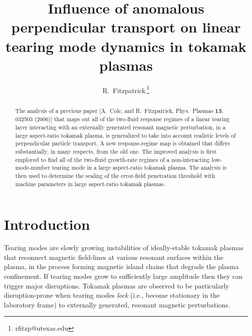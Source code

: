 \documentclass[12pt,prb,aps]{revtex4-1}
\begin{document}
\title{Influence of anomalous perpendicular transport on linear tearing mode dynamics in tokamak plasmas}

\author{R.~Fitzpatrick\,\footnote{rfitzp@utexas.edu}}

\begin{abstract}
The analysis of a previous paper [A.~Cole, and R.~Fitzpatrick, Phys.\ Plasmas {\bf 13}, 032503 (2006)] that maps out all of the
two-fluid response regimes of a  linear tearing layer interacting with an externally generated resonant magnetic perturbation, in a large aspect-ratio tokamak plasma,  is generalized to
take into account realistic levels of perpendicular particle transport. A new response-regime map is obtained that differs substantially, in many
respects, from the old one. The improved analysis is first employed to find all of the two-fluid growth-rate regimes of a non-interacting low-mode-number tearing mode in a large aspect-ratio tokamak plasma. 
The analysis is then used to determine the scaling of the error-field penetration threshold with machine
parameters in large aspect-ratio tokamak plasmas. 
\end{abstract}

\maketitle

\section{Introduction}
Tearing modes are slowly growing instabilities of ideally-stable tokamak plasmas that reconnect magnetic field-lines
at various resonant surfaces within the plasma, in the process forming magnetic island chains that degrade the plasma confinement.\cite{wes}
If tearing modes grow to sufficiently large amplitude then they can trigger major disruptions.\cite{wes1}  Tokamak
plasmas are observed to be particularly disruption-prone when tearing modes {\em lock}\/ (i.e., become stationary in the
laboratory frame) to externally generated, resonant magnetic perturbations.\cite{vries}  
\end{document}
